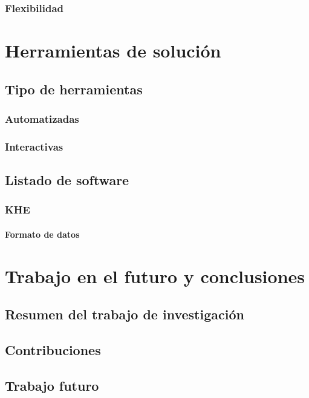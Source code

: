 \documentclass[draft,12pt,headsepline,footsepline,paper=letter]{scrreprt}
\begin{document}
\subsection{Flexibilidad}

\chapter{Herramientas de solución}

\section{Tipo de herramientas}

\subsection{Automatizadas}

\subsection{Interactivas}

\section{Listado de software}

\subsection{KHE}

\subsubsection{Formato de datos}

\chapter{Trabajo en el futuro y conclusiones}

\section{Resumen del trabajo de investigación}

\section{Contribuciones}

\section{Trabajo futuro}
\end{document}
